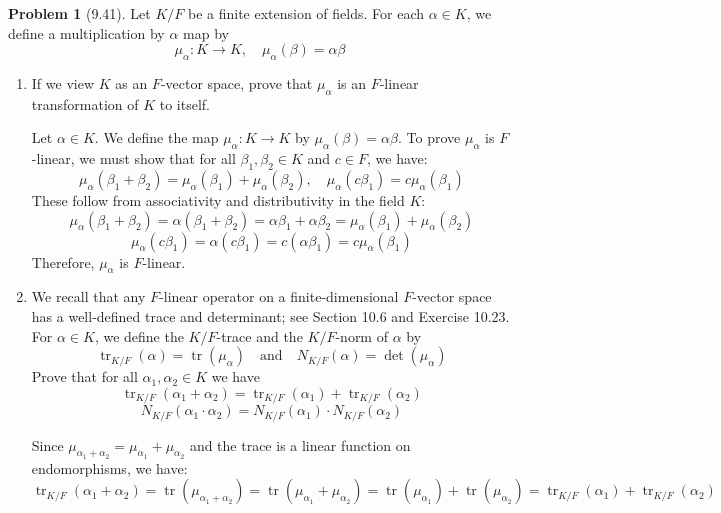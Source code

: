 \documentclass[12pt]{article}
\theoremstyle{definition}
\newtheorem{problem}{Problem}
\DeclareMathOperator{\tr}{tr}
\begin{document}
\begin{problem}[9.41]
    Let $K/F$ be a finite extension of fields. For each $\alpha \in K$, we define a multiplication by $\alpha$ map by
    \[
        \mu_\alpha : K \longrightarrow K, \quad \mu_\alpha(\beta) = \alpha\beta
    \]
    \begin{enumerate}[label=(\alph*)]
        \item If we view $K$ as an $F$-vector space, prove that $\mu_\alpha$ is an $F$-linear transformation of $K$ to itself.
        \begin{solution}
            Let $\alpha \in K$. We define the map $\mu_\alpha : K \to K$ by $\mu_\alpha(\beta) = \alpha\beta$. To prove $\mu_\alpha$ is $F$-linear, we must show that for all $\beta_1, \beta_2 \in K$ and $c \in F$, we have:
            \[
                \mu_\alpha(\beta_1 + \beta_2) = \mu_\alpha(\beta_1) + \mu_\alpha(\beta_2), \quad \mu_\alpha(c \beta_1) = c \mu_\alpha(\beta_1)
            \]
            These follow from associativity and distributivity in the field $K$:
            \[
                \mu_\alpha(\beta_1 + \beta_2) = \alpha(\beta_1 + \beta_2) = \alpha\beta_1 + \alpha\beta_2 = \mu_\alpha(\beta_1) + \mu_\alpha(\beta_2)
            \]
            \[
                \mu_\alpha(c \beta_1) = \alpha(c \beta_1) = c(\alpha \beta_1) = c \mu_\alpha(\beta_1)
            \]
            Therefore, $\mu_\alpha$ is $F$-linear.
        \end{solution}

        \item We recall that any $F$-linear operator on a finite-dimensional $F$-vector space has a well-defined
              trace and determinant; see Section 10.6 and Exercise 10.23. For $\alpha \in K$, we define the $K/F$-trace
              and the $K/F$-norm of $\alpha$ by
              \[
                  \tr_{K/F}(\alpha) = \tr(\mu_\alpha) \quad \text{and} \quad N_{K/F}(\alpha) = \det(\mu_\alpha)
              \]
              Prove that for all $\alpha_1, \alpha_2 \in K$ we have
              \[
                    \tr_{K/F}(\alpha_1 + \alpha_2) = \tr_{K/F}(\alpha_1) + \tr_{K/F}(\alpha_2)
              \]
              \[
                    N_{K/F}(\alpha_1 \cdot \alpha_2) = N_{K/F}(\alpha_1) \cdot N_{K/F}(\alpha_2)
              \]
        \begin{solution}
            Since $\mu_{\alpha_1 + \alpha_2} = \mu_{\alpha_1} + \mu_{\alpha_2}$ and the trace is a linear function on endomorphisms, we have:
            \[
                \tr_{K/F}(\alpha_1 + \alpha_2) = \tr(\mu_{\alpha_1 + \alpha_2}) = \tr(\mu_{\alpha_1} + \mu_{\alpha_2}) = \tr(\mu_{\alpha_1}) + \tr(\mu_{\alpha_2}) = \tr_{K/F}(\alpha_1) + \tr_{K/F}(\alpha_2)
            \]


\end{solution}
\end{enumerate}
\end{problem}
\end{document}
